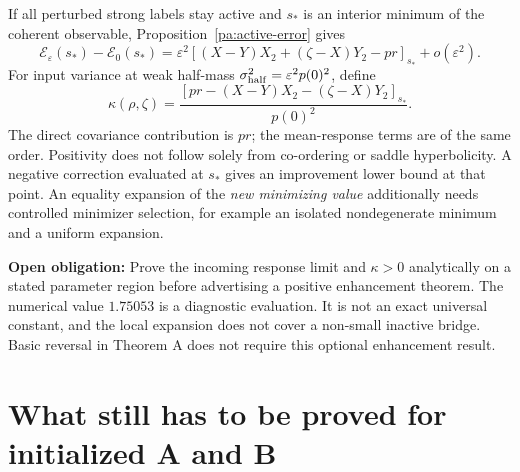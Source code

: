 \documentclass[11pt]{article}
\numberwithin{equation}{section}
\theoremstyle{definition}
\theoremstyle{remark}
\newcommand{\1}{\mathbf 1}
\newcommand{\openobligation}[1]{\par\noindent\textbf{Open obligation:} #1\par\smallskip}
\begin{document}
If all perturbed strong labels stay active and $s_*$ is an interior minimum
of the coherent observable, Proposition~\ref{pa:active-error} gives
\begin{equation}\label{pa:response-error}
 \mathcal E_\varepsilon(s_*)-\mathcal E_0(s_*)
 =\varepsilon^2[(X-Y)X_2+(\zeta-X)Y_2-pr]_{s_*}
 +o(\varepsilon^2).
\end{equation}
For input variance at weak half-mass
$\sigma_{\rm half}^2=\varepsilon^2p(0)^2$, define
\begin{equation}\label{pa:kappa}
 \kappa(\rho,\zeta)=
 \frac{[pr-(X-Y)X_2-(\zeta-X)Y_2]_{s_*}}{p(0)^2}.
\end{equation}
The direct covariance contribution is $pr$; the mean-response terms are of
the same order. Positivity does not follow solely from co-ordering or saddle
hyperbolicity. A negative correction evaluated at $s_*$ gives an improvement
lower bound at that point. An equality expansion of the \emph{new minimizing
value} additionally needs controlled minimizer selection, for example an
isolated nondegenerate minimum and a uniform expansion.

\openobligation{Prove the incoming response limit and $\kappa>0$ analytically
on a stated parameter region before advertising a positive enhancement
theorem. The numerical value $1.75053$ is a diagnostic evaluation. It is not
an exact universal constant, and the local expansion does not cover a
non-small inactive bridge. Basic reversal in Theorem A does not require
this optional enhancement result.}

\section{What still has to be proved for initialized A and B}\label{pa:roadmap}
\end{document}
